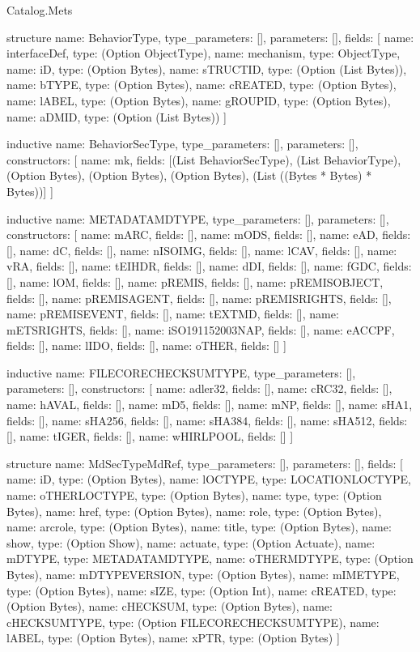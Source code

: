 \begin{lexlean}{Catalog.Mets}
\begin{semanticmodule}
structure{
  name: BehaviorType,
  type_parameters: [],
  parameters: [],
  fields: [
    {name: interfaceDef, type: (Option ObjectType)},
    {name: mechanism, type: ObjectType},
    {name: iD, type: (Option Bytes)},
    {name: sTRUCTID, type: (Option (List Bytes))},
    {name: bTYPE, type: (Option Bytes)},
    {name: cREATED, type: (Option Bytes)},
    {name: lABEL, type: (Option Bytes)},
    {name: gROUPID, type: (Option Bytes)},
    {name: aDMID, type: (Option (List Bytes))}
  ]
}

inductive{
  name: BehaviorSecType,
  type_parameters: [],
  parameters: [],
  constructors: [
    {name: mk, fields: [(List BehaviorSecType), (List BehaviorType), (Option Bytes), (Option Bytes), (Option Bytes), (List ((Bytes * Bytes) * Bytes))]}
  ]
}

inductive{
  name: METADATAMDTYPE,
  type_parameters: [],
  parameters: [],
  constructors: [
    {name: mARC, fields: []},
    {name: mODS, fields: []},
    {name: eAD, fields: []},
    {name: dC, fields: []},
    {name: nISOIMG, fields: []},
    {name: lCAV, fields: []},
    {name: vRA, fields: []},
    {name: tEIHDR, fields: []},
    {name: dDI, fields: []},
    {name: fGDC, fields: []},
    {name: lOM, fields: []},
    {name: pREMIS, fields: []},
    {name: pREMISOBJECT, fields: []},
    {name: pREMISAGENT, fields: []},
    {name: pREMISRIGHTS, fields: []},
    {name: pREMISEVENT, fields: []},
    {name: tEXTMD, fields: []},
    {name: mETSRIGHTS, fields: []},
    {name: iSO191152003NAP, fields: []},
    {name: eACCPF, fields: []},
    {name: lIDO, fields: []},
    {name: oTHER, fields: []}
  ]
}

inductive{
  name: FILECORECHECKSUMTYPE,
  type_parameters: [],
  parameters: [],
  constructors: [
    {name: adler32, fields: []},
    {name: cRC32, fields: []},
    {name: hAVAL, fields: []},
    {name: mD5, fields: []},
    {name: mNP, fields: []},
    {name: sHA1, fields: []},
    {name: sHA256, fields: []},
    {name: sHA384, fields: []},
    {name: sHA512, fields: []},
    {name: tIGER, fields: []},
    {name: wHIRLPOOL, fields: []}
  ]
}

structure{
  name: MdSecTypeMdRef,
  type_parameters: [],
  parameters: [],
  fields: [
    {name: iD, type: (Option Bytes)},
    {name: lOCTYPE, type: LOCATIONLOCTYPE},
    {name: oTHERLOCTYPE, type: (Option Bytes)},
    {name: type, type: (Option Bytes)},
    {name: href, type: (Option Bytes)},
    {name: role, type: (Option Bytes)},
    {name: arcrole, type: (Option Bytes)},
    {name: title, type: (Option Bytes)},
    {name: show, type: (Option Show)},
    {name: actuate, type: (Option Actuate)},
    {name: mDTYPE, type: METADATAMDTYPE},
    {name: oTHERMDTYPE, type: (Option Bytes)},
    {name: mDTYPEVERSION, type: (Option Bytes)},
    {name: mIMETYPE, type: (Option Bytes)},
    {name: sIZE, type: (Option Int)},
    {name: cREATED, type: (Option Bytes)},
    {name: cHECKSUM, type: (Option Bytes)},
    {name: cHECKSUMTYPE, type: (Option FILECORECHECKSUMTYPE)},
    {name: lABEL, type: (Option Bytes)},
    {name: xPTR, type: (Option Bytes)}
  ]
}


\end{semanticmodule}
\end{lexlean}
